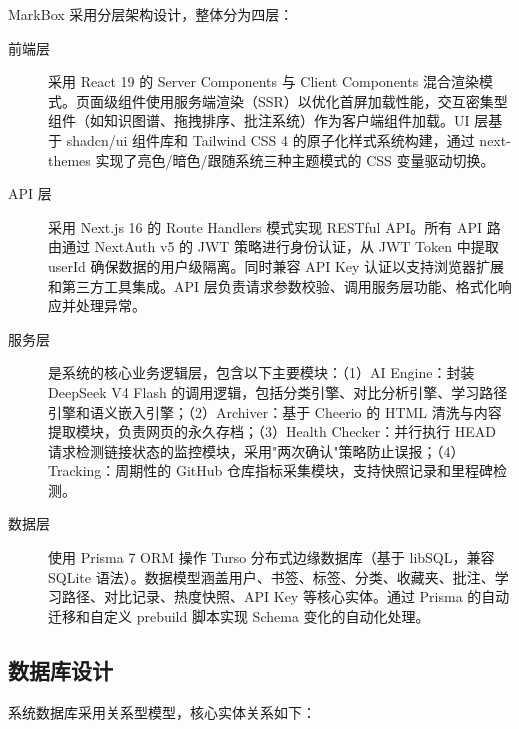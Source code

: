 \documentclass[12pt,a4paper]{ctexart}
\begin{document}
MarkBox 采用分层架构设计，整体分为四层：


\begin{description}
  \item[前端层] 采用 React 19 的 Server Components 与 Client Components 混合渲染模式。页面级组件使用服务端渲染（SSR）以优化首屏加载性能，交互密集型组件（如知识图谱、拖拽排序、批注系统）作为客户端组件加载。UI 层基于 shadcn/ui 组件库和 Tailwind CSS 4 的原子化样式系统构建，通过 next-themes 实现了亮色/暗色/跟随系统三种主题模式的 CSS 变量驱动切换。
  \item[API 层] 采用 Next.js 16 的 Route Handlers 模式实现 RESTful API。所有 API 路由通过 NextAuth v5 的 JWT 策略进行身份认证，从 JWT Token 中提取 userId 确保数据的用户级隔离。同时兼容 API Key 认证以支持浏览器扩展和第三方工具集成。API 层负责请求参数校验、调用服务层功能、格式化响应并处理异常。
  \item[服务层] 是系统的核心业务逻辑层，包含以下主要模块：（1）AI Engine：封装 DeepSeek V4 Flash 的调用逻辑，包括分类引擎、对比分析引擎、学习路径引擎和语义嵌入引擎；（2）Archiver：基于 Cheerio 的 HTML 清洗与内容提取模块，负责网页的永久存档；（3）Health Checker：并行执行 HEAD 请求检测链接状态的监控模块，采用"两次确认"策略防止误报；（4）Tracking：周期性的 GitHub 仓库指标采集模块，支持快照记录和里程碑检测。
  \item[数据层] 使用 Prisma 7 ORM 操作 Turso 分布式边缘数据库（基于 libSQL，兼容 SQLite 语法）。数据模型涵盖用户、书签、标签、分类、收藏夹、批注、学习路径、对比记录、热度快照、API Key 等核心实体。通过 Prisma 的自动迁移和自定义 prebuild 脚本实现 Schema 变化的自动化处理。
\end{description}

\subsection{数据库设计}

系统数据库采用关系型模型，核心实体关系如下：
\end{document}
